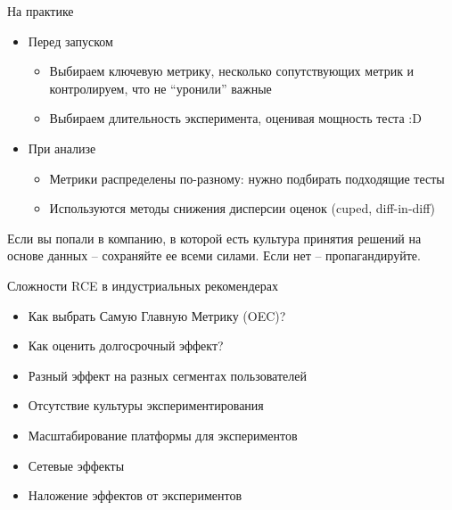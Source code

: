\documentclass[11pt,aspectratio=169,handout]{beamer}
\begin{document}
\begin{frame}{На практике}

\begin{itemize}

\item Перед запуском
\begin{itemize}
\item Выбираем ключевую метрику, несколько сопутствующих метрик и контролируем, что не ``уронили'' важные
\item Выбираем длительность эксперимента, оценивая мощность теста :D
\end{itemize} 

\item При анализе
\begin{itemize}
\item Метрики распределены по-разному: нужно подбирать подходящие тесты
\item Используются методы снижения дисперсии оценок (cuped, diff-in-diff)
\end{itemize}

\end{itemize}

\vfill

\begin{tcolorbox}[colback=info!5,colframe=info!80]
Если вы попали в компанию, в которой есть культура принятия решений на основе данных -- сохраняйте ее всеми силами. Если нет -- пропагандируйте.
\end{tcolorbox}

\end{frame}

\begin{frame}{Сложности RCE в индустриальных рекомендерах \cite{FACEBOOK}}

\begin{itemize}[<+->]
\item Как выбрать Самую Главную Метрику (OEC)? 
\item Как оценить долгосрочный эффект?
\item Разный эффект на разных сегментах пользователей
\item Отсутствие культуры экспериментирования
\item Масштабирование платформы для экспериментов
\item Сетевые эффекты
\item Наложение эффектов от экспериментов
\end{itemize}

\end{frame}
\end{document}
